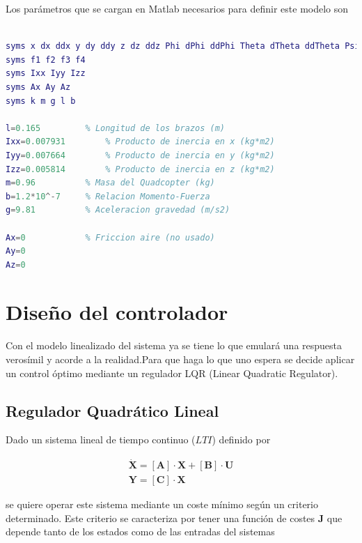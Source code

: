 \documentclass[twoside,11pt]{book}
\begin{document}
Los parámetros que se cargan en Matlab necesarios para definir este modelo son
\begin{lstlisting}[language=Matlab]
% Declaracion simbolica de las variables

syms x dx ddx y dy ddy z dz ddz Phi dPhi ddPhi Theta dTheta ddTheta Psi dPsi ddPsi
syms f1 f2 f3 f4 
syms Ixx Iyy Izz
syms Ax Ay Az 
syms k m g l b

l=0.165			% Longitud de los brazos (m)
Ixx=0.007931		% Producto de inercia en x (kg*m2)
Iyy=0.007664		% Producto de inercia en y (kg*m2)
Izz=0.005814		% Producto de inercia en z (kg*m2)
m=0.96			% Masa del Quadcopter (kg)
b=1.2*10^-7		% Relacion Momento-Fuerza
g=9.81			% Aceleracion gravedad (m/s2)

Ax=0			% Friccion aire (no usado)
Ay=0
Az=0
\end{lstlisting}


\newpage
\chapter{Diseño del controlador} \label{control}

Con el modelo linealizado del sistema ya se tiene lo que emulará una respuesta verosímil y acorde a la realidad.Para que haga lo que uno espera  se decide aplicar un control óptimo mediante un regulador LQR (Linear Quadratic Regulator). \\

\section{Regulador Quadrático Lineal}

Dado un sistema lineal de tiempo continuo ($LTI$) definido por 

\begin{equation}
\begin{array}{l}
\dot{\mathbf{X}}=[\mathbf{A}] \cdot \mathbf{X} + [\mathbf{B}] \cdot \mathbf{U} \\
\mathbf{Y} = [\mathbf{C}] \cdot \mathbf{X} 
\end{array}
\end{equation} 

se quiere operar este sistema mediante un coste mínimo según un criterio determinado. Este criterio se caracteriza por tener una función de costes $\mathbf{J}$ que depende tanto de los estados como de las entradas del sistemas \cite{LQR_Wikipedia}
\end{document}
